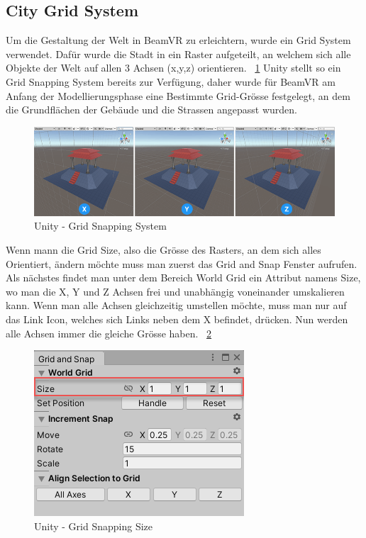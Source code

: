 \subsection{City Grid System}\label{subsec:city-grid-system}
Um die Gestaltung der Welt in BeamVR zu erleichtern, wurde ein Grid System verwendet.
Dafür wurde die Stadt in ein Raster aufgeteilt, an welchem sich alle Objekte der Welt auf allen 3 Achsen (x,y,z) orientieren.
~\ref{fig:grid-system-unity}
Unity stellt so ein Grid Snapping System bereits zur Verf\"ugung, daher wurde f\"ur BeamVR am Anfang der
Modellierungsphase eine Bestimmte Grid-Gr\"osse festgelegt, an dem die Grundfl\"achen der Geb\"aude und die Strassen
angepasst wurden.

\begin {figure}
    \includegraphics[scale=0.18]{pics/unity-grid-snapping}
    \caption{Unity - Grid Snapping System}
    \label{fig:grid-system-unity}
\end {figure}

Wenn mann die Grid Size, also die Gr\"osse des Rasters, an dem sich alles Orientiert, \"andern m\"ochte muss man zuerst das Grid and Snap Fenster aufrufen.
Als n\"achstes findet man unter dem Bereich World Grid ein Attribut namens Size, wo man die X, Y und Z Achsen frei und unabh\"angig voneinander umskalieren kann.
Wenn man alle Achsen gleichzeitig umstellen m\"ochte, muss man nur auf das Link Icon, welches sich Links neben dem X befindet, dr\"ucken.
Nun werden alle Achsen immer die gleiche Gr\"osse haben.
~\ref{fig:grid-size-unity}
~\cite{Unity_GridSnapping_2022}

\begin {figure}
    \includegraphics[scale=0.18]{pics/unity-grid-snapping-size}
    \caption{Unity - Grid Snapping Size}
    \label{fig:grid-size-unity}
\end {figure}



